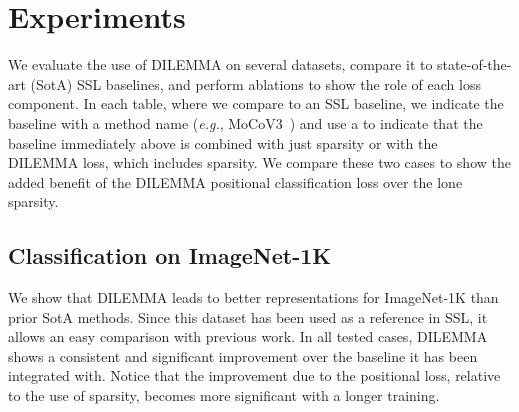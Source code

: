 \documentclass[letterpaper]{article} \usepackage{aaai23}  \usepackage{times}  \usepackage{helvet}  \usepackage{courier}  \usepackage[hyphens]{url}  \usepackage{graphicx} \urlstyle{rm} \def\UrlFont{\rm}  \usepackage{natbib}  \usepackage{caption} \frenchspacing  \setlength{\pdfpagewidth}{8.5in}  \setlength{\pdfpageheight}{11in}  \usepackage{algorithm}
\newcommand{\methodname}{DILEMMA}
\begin{document}
\section{Experiments}

We evaluate the use of {\methodname} on several datasets, compare it to state-of-the-art (SotA) SSL baselines, and perform ablations to show the role of each loss component.
In each table, where we compare to an SSL baseline, we indicate the  baseline with a method name (\emph{e.g.}, MoCoV3~\cite{chen2021empirical}) and use a  to indicate that the baseline immediately above is combined with just sparsity or with the {\methodname} loss, which includes sparsity. We compare these two cases to show the added benefit of the {\methodname} positional classification loss over the lone sparsity.

\subsection{Classification on ImageNet-1K}

We show that {\methodname} leads to better representations for ImageNet-1K than prior SotA methods. Since this dataset has been used as a reference in SSL, it allows an easy comparison with previous work. 
In all tested cases, {\methodname} shows a consistent and significant improvement over the baseline it has been integrated with.
Notice that the improvement due to the positional loss, relative to the use of sparsity, becomes more significant with a longer training.\\
\end{document}
